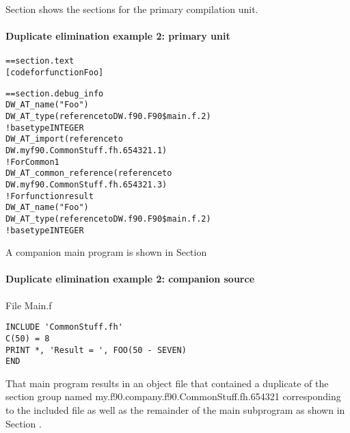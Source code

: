 Section 
shows the sections for the primary compilation unit.



\paragraph{Duplicate elimination example 2: primary unit }
\label{app:duplicateeliminationexample2primaryunit}
\begin{alltt}
== section .text
    [code for function Foo]

== section .debug\_info
            DW\_AT\_name("Foo")
            DW\_AT\_type(reference to DW.f90.F90\$main.f.2)
                ! base type INTEGER
                DW\_AT\_import(reference to
                    DW.myf90.CommonStuff.fh.654321.1)
             ! For Common1
                DW\_AT\_common\_reference(reference to
                    DW.myf90.CommonStuff.fh.654321.3)
             ! For function result
                DW\_AT\_name("Foo")
                    DW\_AT\_type(reference to DW.f90.F90\$main.f.2)
                        ! base type INTEGER
\end{alltt}

A companion main program is shown in 
Section 

\paragraph{Duplicate elimination example 2: companion source }
\label{app:duplicateeliminationexample2companionsource}

File Main.f 

\begin{lstlisting}
INCLUDE 'CommonStuff.fh'
C(50) = 8
PRINT *, 'Result = ', FOO(50 - SEVEN)
END
\end{lstlisting}

That main program results in an object file that
contained a duplicate of the section group named
my.f90.company.f90.CommonStuff.fh.654321 
corresponding to the
included file as well as the remainder of the main subprogram
as shown in 
Section .

